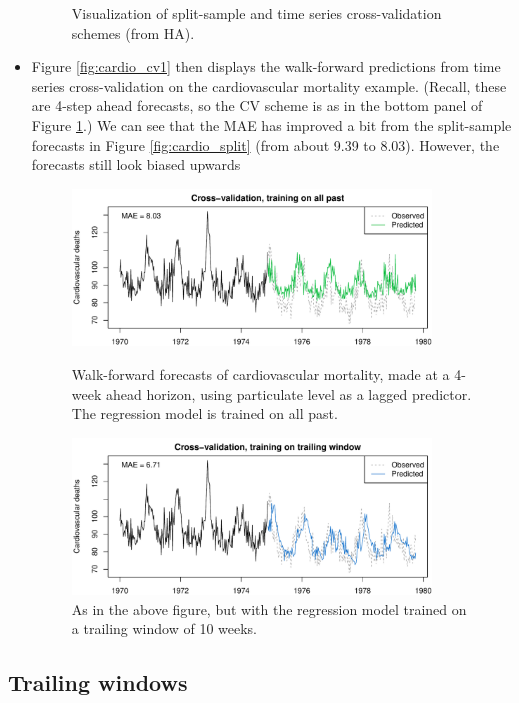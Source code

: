 \documentclass{article}
\begin{document}
\begin{itemize}
\begin{figure}[p]
\medskip
\caption{Visualization of split-sample and time series cross-validation schemes
  (from HA).} 
\label{fig:split_cv}
\end{figure}

\item Figure \ref{fig:cardio_cv1} then displays the walk-forward predictions
  from time series cross-validation on the cardiovascular mortality
  example. (Recall, these are 4-step ahead forecasts, so the CV scheme is as in
  the bottom panel of Figure \ref{fig:split_cv}.) We can see that the MAE has
  improved a bit from the split-sample forecasts in Figure
  \ref{fig:cardio_split} (from about 9.39 to 8.03). However, the forecasts still
  look biased upwards  

\begin{figure}[htb]
\centering
\includegraphics[width=0.9\textwidth]{fig/cardio-cv-1.pdf} 
\caption{Walk-forward forecasts of cardiovascular mortality, made at a 4-week
  ahead horizon, using particulate level as a lagged predictor. The regression
  model is trained on all past.} 
\label{fig:cardio_cv1}

\bigskip
\includegraphics[width=0.9\textwidth]{fig/cardio-cv-2.pdf} 
\caption{As in the above figure, but with the regression model trained on a
  trailing window of 10 weeks.} 
\label{fig:cardio_cv2}
\end{figure}
\end{itemize}

\subsection{Trailing windows}
\end{document}
